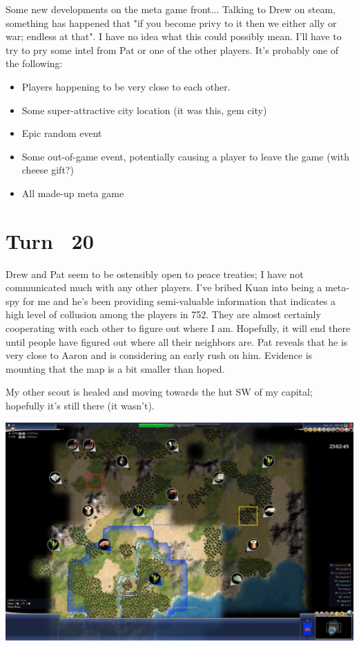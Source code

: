 \documentclass[10pt]{article}
\begin{document}
Some new developments on the meta game front... Talking to Drew on
steam, something has happened that "if you become privy to it then we
either ally or war; endless at that". I have no idea what this could
possibly mean. I'll have to try to pry some intel from Pat or one of
the other players. It's probably one of the following:
\begin{itemize}
\item Players happening to be very close to each other.
\item Some super-attractive city location (it was this, gem city)
\item Epic random event
\item Some out-of-game event, potentially causing a player to leave the game (with cheese gift?)
\item All made-up meta game
\end{itemize}

\section*{Turn ~20}

Drew and Pat seem to be ostensibly open to peace treaties; I have not
communicated much with any other players. I've bribed Kuan into being
a meta-spy for me and he's been providing semi-valuable information
that indicates a high level of collusion among the players in
752. They are almost certainly cooperating with each other to figure
out where I am. Hopefully, it will end there until people have figured
out where all their neighbors are. Pat reveals that he is very close
to Aaron and is considering an early rush on him. Evidence is mounting
that the map is a bit smaller than hoped.

My other scout is healed and moving towards the hut SW of my capital;
hopefully it's still there (it wasn't).

\includegraphics[width=1.0\textwidth]{turn26}
\end{document}
